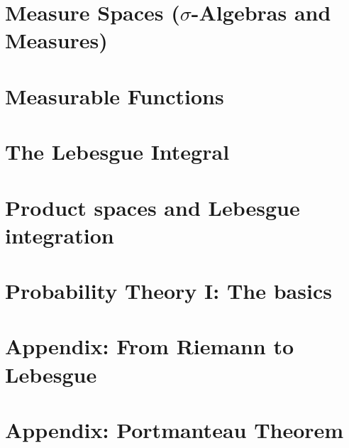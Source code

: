 \documentclass{lecturenotes}
\begin{document}
\chapter{Measure Spaces ($\sigma$-Algebras and Measures)}
\label{chapter:sigma_algebras}


\chapter{Measurable Functions}
\label{chapter:measurable_functions}


\chapter{The Lebesgue Integral}
\label{chapter:integration}


\chapter{Product spaces and Lebesgue integration}
\label{chapter:fubini-tonelli}


\chapter{Probability Theory I: The basics}
\label{chapter:probability_1}


%
%
%
%
%
%
%
%
%
%
\chapter{Appendix: From Riemann to Lebesgue}
\label{chapter:appendix-2}


\chapter{Appendix: Portmanteau Theorem}
\label{chapter:appendix-portmanteau}


%
\end{document}

